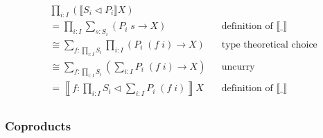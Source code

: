 \begin{code}%
\>[0]\AgdaSpace{}%
\AgdaSymbol{:}\AgdaSpace{}%
\AgdaSymbol{(}\AgdaSpace{}%
\AgdaSpace{}%
\AgdaSymbol{)}\AgdaSpace{}%
\AgdaSpace{}%
\<%
\\
\>[0]\AgdaSpace{}%
\AgdaSymbol{\{}\AgdaSymbol{\}}\AgdaSpace{}%
\AgdaSpace{}%
\AgdaSymbol{=}\AgdaSpace{}%
\AgdaSymbol{((}\AgdaSpace{}%
\AgdaSymbol{:}\AgdaSpace{}%
\AgdaSymbol{)}\AgdaSpace{}%
\AgdaSpace{}%
\AgdaSpace{}%
\AgdaSpace{}%
\AgdaSymbol{)}\AgdaSpace{}%
\AgdaSpace{}%
\AgdaSpace{}%
\AgdaSpace{}%
\AgdaSpace{}%
\AgdaFunction{Σ[}\AgdaSpace{}%
\AgdaSpace{}%
\AgdaSpace{}%
\AgdaSpace{}%
\AgdaFunction{]}\AgdaSpace{}%
\AgdaSpace{}%
\AgdaSpace{}%
\AgdaSpace{}%
\AgdaSymbol{(}\AgdaSpace{}%
\AgdaSymbol{)}\<%
\end{code}

\begin{align*}
& \prod_{i : I} (\llbracket S_i \triangleleft P_i \rrbracket X) \\
&= \prod_{i : I} \sum_{s : S_i} (P_i \; s \to X) && \text{definition of $\llbracket \_ \rrbracket$} \\
&\cong \sum_{f : \prod_{i : I} S_i} \prod_{i : I} (P_i \; (f \; i) \to X) && \text{type theoretical choice} \\
&\cong \sum_{f : \prod_{i : I} S_i} \left( \sum_{i : I} P_i \; (f \; i) \to X \right) && \text{uncurry} \\
&= \left\llbracket f : \prod_{i : I} S_i \triangleleft \sum_{i : I} P_i \; (f \; i) \right\rrbracket X && \text{definition of $\llbracket \_ \rrbracket$} \\
\end{align*}

\subsubsection*{Coproducts}

